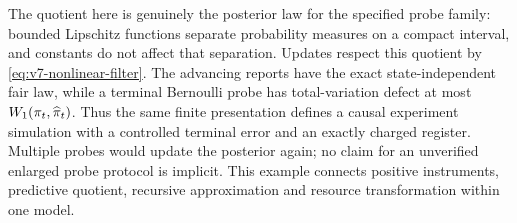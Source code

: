 The quotient here is genuinely the posterior law for the specified
probe family: bounded Lipschitz functions separate probability measures
on a compact interval, and constants do not affect that separation.
Updates respect this quotient by \eqref{eq:v7-nonlinear-filter}. The
advancing reports have the exact state-independent fair law, while a
terminal Bernoulli probe has total-variation defect at most
$W_1(\pi_t,\widehat\pi_t)$. Thus the same finite presentation defines
a causal experiment simulation with a controlled terminal error and an
exactly charged register. Multiple probes would update the posterior
again; no claim for an unverified enlarged probe protocol is implicit.
This example connects positive instruments, predictive quotient,
recursive approximation and resource transformation within one model.
